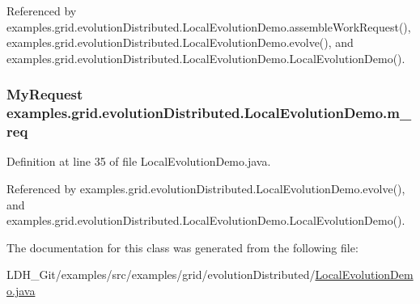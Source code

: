 Referenced by examples.\-grid.\-evolution\-Distributed.\-Local\-Evolution\-Demo.\-assemble\-Work\-Request(), examples.\-grid.\-evolution\-Distributed.\-Local\-Evolution\-Demo.\-evolve(), and examples.\-grid.\-evolution\-Distributed.\-Local\-Evolution\-Demo.\-Local\-Evolution\-Demo().

\hypertarget{classexamples_1_1grid_1_1evolution_distributed_1_1_local_evolution_demo_a6aed0955894a41cd1cd26b23ecfb3022}{
\subsubsection[{m\-\_\-req}]{\setlength{\rightskip}{0pt plus 5cm}My\-Request examples.\-grid.\-evolution\-Distributed.\-Local\-Evolution\-Demo.\-m\-\_\-req\hspace{0.3cm}{\ttfamily [private]}}}\label{classexamples_1_1grid_1_1evolution_distributed_1_1_local_evolution_demo_a6aed0955894a41cd1cd26b23ecfb3022}


Definition at line 35 of file Local\-Evolution\-Demo.\-java.



Referenced by examples.\-grid.\-evolution\-Distributed.\-Local\-Evolution\-Demo.\-evolve(), and examples.\-grid.\-evolution\-Distributed.\-Local\-Evolution\-Demo.\-Local\-Evolution\-Demo().



The documentation for this class was generated from the following file\-:\begin{DoxyCompactItemize}
\item 
L\-D\-H\-\_\-\-Git/examples/src/examples/grid/evolution\-Distributed/\hyperlink{_local_evolution_demo_8java}{Local\-Evolution\-Demo.\-java}\end{DoxyCompactItemize}

